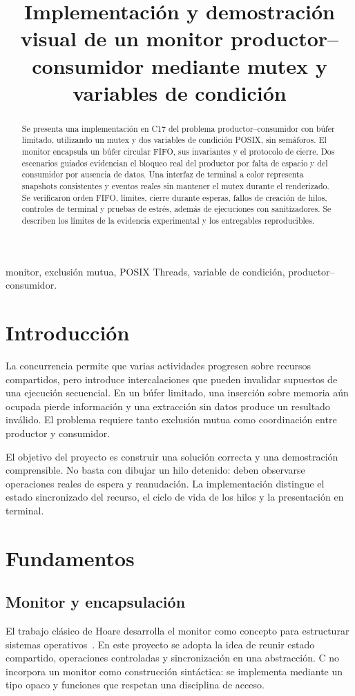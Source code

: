 \documentclass[conference]{IEEEtran}
\title{Implementación y demostración visual de un monitor productor--consumidor mediante mutex y variables de condición}
\author{\IEEEauthorblockN{Equipo del Proyecto 7: completar integrantes}
\IEEEauthorblockA{Sistemas Operativos\\Completar institución, grupo y docente}}
\begin{document}
\maketitle
\begin{abstract}
Se presenta una implementación en C17 del problema productor--consumidor con
búfer limitado, utilizando un mutex y dos variables de condición POSIX, sin
semáforos. El monitor encapsula un búfer circular FIFO, sus invariantes y el
protocolo de cierre. Dos escenarios guiados evidencian el bloqueo real del
productor por falta de espacio y del consumidor por ausencia de datos. Una
interfaz de terminal a color representa snapshots consistentes y eventos reales
sin mantener el mutex durante el renderizado. Se verificaron orden FIFO, límites,
cierre durante esperas, fallos de creación de hilos, controles de terminal y
pruebas de estrés, además de ejecuciones con sanitizadores. Se describen los
límites de la evidencia experimental y los entregables reproducibles.
\end{abstract}
\begin{IEEEkeywords}
monitor, exclusión mutua, POSIX Threads, variable de condición, productor--consumidor.
\end{IEEEkeywords}

\section{Introducción}
La concurrencia permite que varias actividades progresen sobre recursos
compartidos, pero introduce intercalaciones que pueden invalidar supuestos de
una ejecución secuencial. En un búfer limitado, una inserción sobre memoria aún
ocupada pierde información y una extracción sin datos produce un resultado
inválido. El problema requiere tanto exclusión mutua como coordinación entre
productor y consumidor.

El objetivo del proyecto es construir una solución correcta y una demostración
comprensible. No basta con dibujar un hilo detenido: deben observarse operaciones
reales de espera y reanudación. La implementación distingue el estado sincronizado
del recurso, el ciclo de vida de los hilos y la presentación en terminal.

\section{Fundamentos}
\subsection{Monitor y encapsulación}
El trabajo clásico de Hoare desarrolla el monitor como concepto para estructurar
sistemas operativos~\cite{hoare}. En este proyecto se adopta la idea de reunir
estado compartido, operaciones controladas y sincronización en una abstracción.
C no incorpora un monitor como construcción sintáctica: se implementa mediante
un tipo opaco y funciones que respetan una disciplina de acceso.
\end{document}
